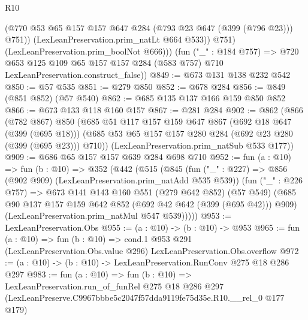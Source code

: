 \begin{lexlean}{R10}
\begin{coremodule}
                (@770 @53 @65 @157 @157 @647 @284 (@793 @23 @647 (@399 (@796 @23))) @751))
              (LexLeanPreservation.prim_natLt @664 @533))
            @751)
          (LexLeanPreservation.prim_boolNot @666)))
      (fun ("_" : @184 @757) =>
      @720 @653 @125 @109 @65 @157 @157 @284 (@583 @757) @710 LexLeanPreservation.construct_false))
@849 := @673 @131 @138 @232 @542
@850 := @57 @535
@851 := @279 @850
@852 := @678 @284
@856 := @849 (@851 @852) (@57 @540)
@862 := @685 @135 @137 @166 @159 @850 @852
@866 := @673 @133 @118 @160 @157
@867 := @281 @284
@902 := @862
    (@866
      (@782 @867)
      @850
      (@685
        @51
        @117
        @157
        @159
        @647
        @867
        (@692 @18 @647 (@399 (@695 @18)))
        (@685 @53 @65 @157 @157 @280 @284 (@692 @23 @280 (@399 (@695 @23))) @710))
      (LexLeanPreservation.prim_natSub @533 @177))
@909 := @686 @65 @157 @157 @639 @284 @698 @710
@952 := fun (a : @10) =>
  fun (b : @10) =>
  @352
    (@442
      (@515
        (@845
          (fun ("_" : @227) => @856 (@902 @909) (LexLeanPreservation.prim_natAdd @535 @539))
          (fun ("_" : @226 @757) =>
          @673
            @141
            @143
            @160
            @551
            (@279 @642 @852)
            (@57 @549)
            (@685 @90 @137 @157 @159 @642 @852 (@692 @42 @642 (@399 (@695 @42))) @909)
            (LexLeanPreservation.prim_natMul @547 @539)))))
@953 := LexLeanPreservation.Obs
@955 := (a : @10) -> (b : @10) -> @953
@965 := fun (a : @10) =>
  fun (b : @10) =>
  cond.{1} @953 @291 (LexLeanPreservation.Obs.value @296) LexLeanPreservation.Obs.overflow
@972 := (a : @10) -> (b : @10) -> LexLeanPreservation.RunConv @275 @18 @286 @297
@983 := fun (a : @10) =>
  fun (b : @10) =>
  LexLeanPreservation.run_of_funRel
    @275
    @18
    @286
    @297
    (LexLeanPreserve.C9967bbbe5c2047f57dda9119fe75d35e.R10.__rel_0 @177 @179)
\end{coremodule}
\end{lexlean}
